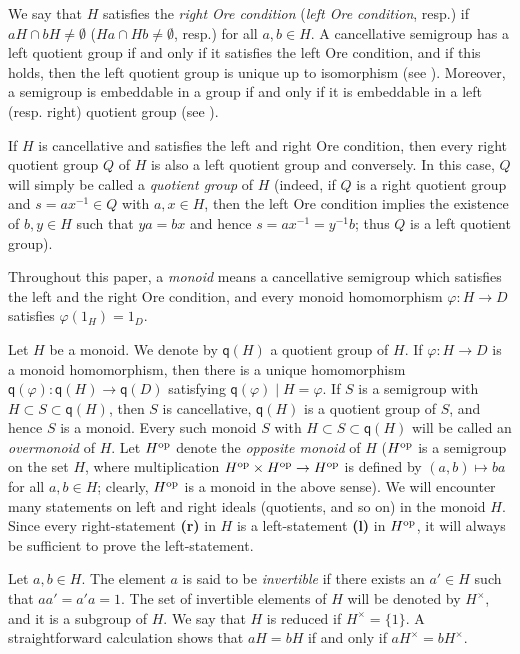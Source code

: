 \documentclass[a4paper]{amsart}
\theoremstyle{definition}
\numberwithin{equation}{section}
\begin{document}
We say that $H$ satisfies the {\it right Ore condition} ({\it left
Ore condition}, resp.) if $aH \cap bH \ne \emptyset$ ($Ha \cap Hb
\ne \emptyset$, resp.) for all $a, b \in H$. A cancellative semigroup
has a left quotient group if and only if it satisfies the left Ore
condition, and if this holds, then the left quotient group is unique
up to isomorphism (see \cite[Theorems 1.24 and 1.25]{Cl-Pr64}).
Moreover, a semigroup is embeddable in a group if and only if it is
embeddable in a left (resp. right) quotient group (see
\cite[Section 12.4]{Cl-Pr67}).

If $H$ is cancellative and satisfies the left and right Ore
condition, then every right quotient group $Q$ of $H$ is also a left
quotient group and conversely. In this case, $Q$ will simply be
called a {\it quotient group} of $H$ (indeed, if $Q$ is a right
quotient group and $s = a x^{-1} \in Q$ with $a, x \in H$, then the
left Ore condition implies the existence of $b, y \in H$ such that
$y a = b x$ and hence $s = a x^{-1} = y^{-1}b$; thus $Q$ is a left
quotient group).

\smallskip
Throughout this paper, a {\it monoid} means a cancellative semigroup
which satisfies the left and the right Ore condition, and every
monoid homomorphism $\varphi \colon H \to D$ satisfies $\varphi
(1_H) = 1_D$.

Let $H$ be a  monoid. We denote by $\mathsf q (H)$ a quotient group
of $H$. If $\varphi \colon H \to D$ is a monoid homomorphism, then
there is a unique homomorphism $\mathsf q (\varphi) \colon \mathsf q
(H) \to \mathsf q (D)$ satisfying $\mathsf q (\varphi) \mid H =
\varphi$. If $S$ is a semigroup with $H \subset S \subset \mathsf q
(H)$, then $S$ is cancellative, $\mathsf q (H)$ is a quotient group
of $S$, and hence $S$ is a monoid. Every such monoid $S$ with $H
\subset S \subset \mathsf q (H)$ will be called an {\it overmonoid}
of $H$. Let $H^{\text{\rm op}}$ denote the {\it opposite monoid} of $H$
($H^{\text{\rm op}}$ is a semigroup  on the set $H$, where multiplication
$H^{\text{\rm op}} \times H^{\text{\rm op}} \to H^{\text{\rm op}}$ is defined by $(a,b) \mapsto
ba$ for all $a, b \in H$; clearly, $H^{\text{\rm op}}$ is a monoid in the
above sense). We will encounter many statements on left and right
ideals (quotients, and so on) in the monoid $H$. Since every
right-statement {\bf (r)} in $H$ is a left-statement {\bf (l)} in
$H^{\text{\rm op}}$, it will always be sufficient to prove the left-statement.

Let $a, b \in H$. The element $a$ is said to be {\it invertible} if
there exists an $a' \in H$ such that $a a' = a' a = 1$. The set of
invertible elements of $H$ will be denoted by $H^{\times}$, and it
is a subgroup of $H$. We say that $H$ is reduced if $H^{\times} =
\{1\}$. A straightforward calculation shows that $aH = bH$ if and
only if $a H^{\times} = b H^{\times}$.
\end{document}
